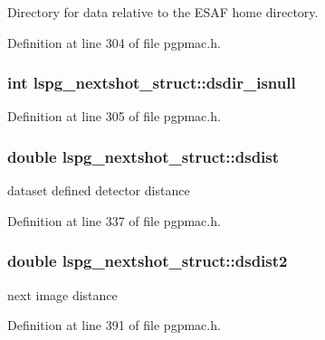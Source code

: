 Directory for data relative to the E\-S\-A\-F home directory. 



Definition at line 304 of file pgpmac.\-h.

\hypertarget{structlspg__nextshot__struct_a8dea57b78b92d67d83ccbb6ed6da13ca}{
\subsubsection[{dsdir\-\_\-isnull}]{\setlength{\rightskip}{0pt plus 5cm}int lspg\-\_\-nextshot\-\_\-struct\-::dsdir\-\_\-isnull}}\label{structlspg__nextshot__struct_a8dea57b78b92d67d83ccbb6ed6da13ca}


Definition at line 305 of file pgpmac.\-h.

\hypertarget{structlspg__nextshot__struct_acab9431a911f5bb11296cbfb271fb83a}{
\subsubsection[{dsdist}]{\setlength{\rightskip}{0pt plus 5cm}double lspg\-\_\-nextshot\-\_\-struct\-::dsdist}}\label{structlspg__nextshot__struct_acab9431a911f5bb11296cbfb271fb83a}


dataset defined detector distance 



Definition at line 337 of file pgpmac.\-h.

\hypertarget{structlspg__nextshot__struct_a516827749068577217b27860a01e6041}{
\subsubsection[{dsdist2}]{\setlength{\rightskip}{0pt plus 5cm}double lspg\-\_\-nextshot\-\_\-struct\-::dsdist2}}\label{structlspg__nextshot__struct_a516827749068577217b27860a01e6041}


next image distance 



Definition at line 391 of file pgpmac.\-h.

